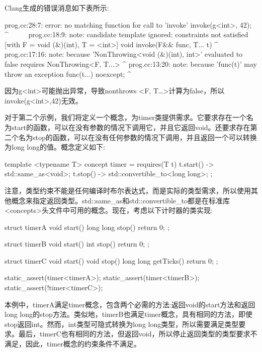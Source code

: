 Clang生成的错误消息如下表所示:

\begin{shell}
prog.cc:28:7: error: no matching function for call to 'invoke'
      invoke(g<int>, 42);
       ^~~~~~
prog.cc:18:9: note: candidate template ignored: constraints not
satisfied [with F = void (&)(int), T = <int>]
   void invoke(F&& func, T... t)
          ^
prog.cc:17:16: note: because 'NonThrowing<void (&)(int), int>'
evaluated to false
      requires NonThrowing<F, T...>
                  ^
prog.cc:13:20: note: because 'func(t)' may throw an exception
      {func(t...)} noexcept;
                       ^
\end{shell}

因为g<int>可能抛出异常，导致nonthrows <F, T…>计算为false，所以invoke(g<int>,42)无效。

对于第二个示例，我们将定义一个概念，为timer类提供需求。它要求存在一个名为start的函数，可以在没有参数的情况下调用它，并且它返回void。还要求存在第二个名为stop的函数，可以在没有任何参数的情况下调用，并且返回一个可以转换为long long的值。概念定义如下:

\begin{cpp}
template <typename T>
concept timer = requires(T t)
{
	{t.start()} -> std::same_as<void>;
	{t.stop()} -> std::convertible_to<long long>;
};
\end{cpp}

注意，类型约束不能是任何编译时布尔表达式，而是实际的类型需求，所以使用其他概念来指定返回类型。std::same\_as和std::convertible\_to都是在标准库<concepts>头文件中可用的概念。现在，考虑以下计时器的类实现:

\begin{cpp}
struct timerA
{
	void start() {}
	long long stop() { return 0; }
};

struct timerB
{
	void start() {}
	int stop() { return 0; }
};

struct timerC
{
	void start() {}
	void stop() {}
	long long getTicks() { return 0; }
};

static_assert(timer<timerA>);
static_assert(timer<timerB>);
static_assert(!timer<timerC>);
\end{cpp}

本例中，timerA满足timer概念，包含两个必需的方法:返回void的start方法和返回long long的stop方法。类似地，timerB也满足timer概念，具有相同的方法，即使stop返回int。然而，int类型可隐式转换为long long类型，所以需要满足类型要求。最后，timerC也有相同的方法，但返回void，所以停止返回类型的类型要求不满足，因此，timer概念的约束条件不满足。

